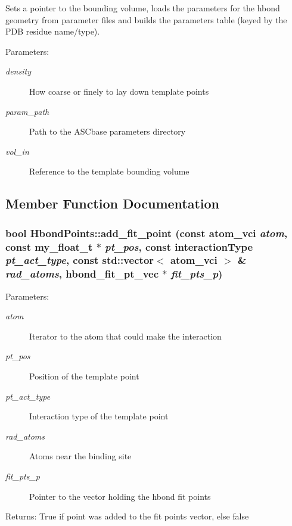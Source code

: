 Sets a pointer to the bounding volume, loads the parameters for the hbond geometry from parameter files and builds the parameters table (keyed by the PDB residue name/type).

\begin{Desc}
\item[Parameters:]
\begin{description}
\item[{\em density}]How coarse or finely to lay down template points \item[{\em param\_\-path}]Path to the ASCbase parameters directory \item[{\em vol\_\-in}]Reference to the template bounding volume \end{description}
\end{Desc}


\subsection{Member Function Documentation}
\subsubsection{\setlength{\rightskip}{0pt plus 5cm}bool Hbond\-Points::add\_\-fit\_\-point (const atom\_\-vci {\em atom}, const my\_\-float\_\-t $\ast$ {\em pt\_\-pos}, const interaction\-Type {\em pt\_\-act\_\-type}, const std::vector$<$ atom\_\-vci $>$ \& {\em rad\_\-atoms}, \bf{hbond\_\-fit\_\-pt\_\-vec} $\ast$ {\em fit\_\-pts\_\-p})\hspace{0.3cm}{\tt  [private]}}\label{classASCbase_1_1HbondPoints_14615a8c95ec86228c24de2b96dab9eb}


\begin{Desc}
\item[Parameters:]
\begin{description}
\item[{\em atom}]Iterator to the atom that could make the interaction \item[{\em pt\_\-pos}]Position of the template point \item[{\em pt\_\-act\_\-type}]Interaction type of the template point \item[{\em rad\_\-atoms}]Atoms near the binding site \item[{\em fit\_\-pts\_\-p}]Pointer to the vector holding the hbond fit points \end{description}
\end{Desc}
\begin{Desc}
\item[Returns:]True if point was added to the fit points vector, else false \end{Desc}

